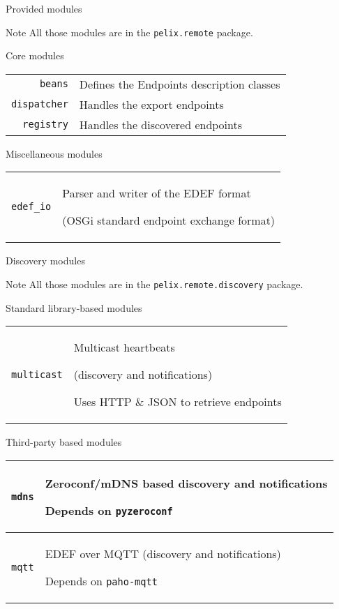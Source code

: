 \begin{frame}{Provided modules}
\begin{exampleblock}{Note}
All those modules are in the \texttt{pelix.remote} package.
\end{exampleblock}

\begin{block}{Core modules}
\begin{tabular}{rp{}}
\texttt{beans} & Defines the Endpoints description classes \\
\texttt{dispatcher} & Handles the export endpoints \\
\texttt{registry} & Handles the discovered endpoints \\
\end{tabular}
\end{block}

\begin{block}{Miscellaneous modules}
\begin{tabular}{rp{}}
\texttt{edef\_io} & Parser and writer of the EDEF format \par (OSGi standard endpoint exchange format) \\
\end{tabular}
\end{block}
\end{frame}


\begin{frame}{Discovery modules}
\begin{exampleblock}{Note}
All those modules are in the \texttt{pelix.remote.discovery} package.
\end{exampleblock}

\begin{block}{Standard library-based modules}
\begin{tabular}{rp{}}
\texttt{multicast} & Multicast heartbeats \par (discovery and notifications) \par Uses HTTP \& JSON to retrieve endpoints \\
\end{tabular}
\end{block}

\begin{block}{Third-party based modules}
\begin{tabular}{rp{}}
\texttt{mdns} & Zeroconf/mDNS based discovery and notifications \par Depends on \texttt{pyzeroconf} \\
\hline
\texttt{mqtt} & EDEF over MQTT (discovery and notifications) \par Depends on \texttt{paho-mqtt} \\
\end{tabular}
\end{block}
\end{frame}

